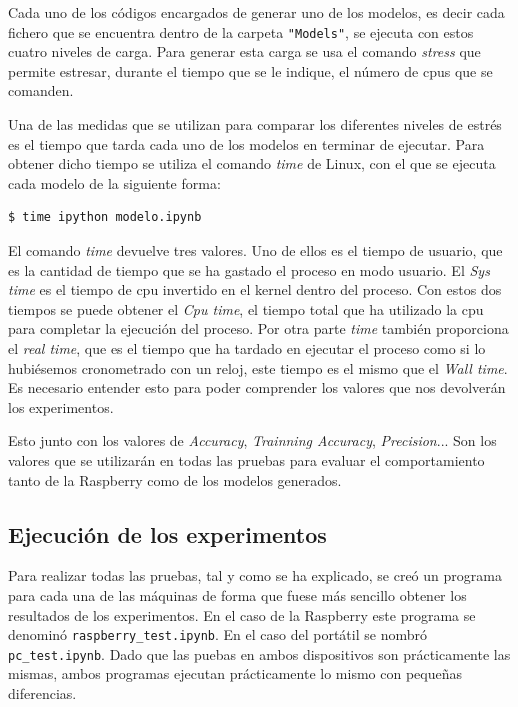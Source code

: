 \documentclass[a4paper, 12pt]{book}
\begin{document}
Cada uno de los códigos encargados de generar uno de los modelos, es decir cada fichero que se encuentra dentro de la carpeta \texttt{"Models"}, se ejecuta con estos cuatro niveles de carga. Para generar esta carga se usa el comando \textit{stress} que permite estresar, durante el tiempo que se le indique, el número de cpus que se comanden. 

Una de las medidas que se utilizan para comparar los diferentes niveles de estrés es el tiempo que tarda cada uno de los modelos en terminar de ejecutar. Para obtener dicho tiempo se utiliza el comando \textit{time} de Linux, con el que se ejecuta cada modelo de la siguiente forma:\\

\begin{lstlisting}[language=bash]
  $ time ipython modelo.ipynb
\end{lstlisting}

El comando \textit{time} devuelve tres valores. Uno de ellos es el tiempo de usuario, que es la cantidad de tiempo que se ha gastado el proceso en modo usuario. El \textit{Sys time} es el tiempo de cpu invertido en el kernel dentro del proceso. Con estos dos tiempos se puede obtener el \textit{Cpu time}, el tiempo total que ha utilizado la cpu para completar la ejecución del proceso. Por otra parte \textit{time} también proporciona el \textit{real time}, que es el tiempo que ha tardado en ejecutar el proceso como si lo hubiésemos cronometrado con un reloj, este tiempo es el mismo que el \textit{Wall time}. Es necesario entender esto para poder comprender los valores que nos devolverán los experimentos.

Esto junto con los valores de \textit{Accuracy}, \textit{Trainning Accuracy}, \textit{Precision}... Son los valores que se utilizarán en todas las pruebas para evaluar el comportamiento tanto de la Raspberry como de los modelos generados.

\subsection{Ejecución de los experimentos}
\label{subsec:ejecucion_experimentos}

Para realizar todas las pruebas, tal y como se ha explicado, se creó un programa para cada una de las máquinas de forma que fuese más sencillo obtener los resultados de los experimentos. En el caso de la Raspberry este programa se denominó \texttt{raspberry\_test.ipynb}. En el caso del portátil se nombró \texttt{pc\_test.ipynb}. Dado que las puebas en ambos dispositivos son prácticamente las mismas, ambos programas ejecutan prácticamente lo mismo con pequeñas diferencias.
\end{document}
